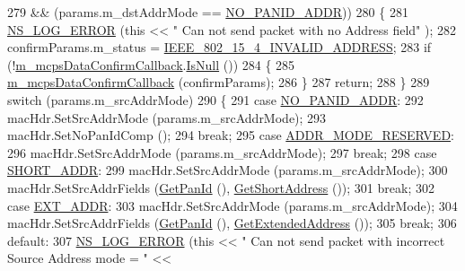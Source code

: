 \begin{DoxyCode}
279       && (params.m\_dstAddrMode == \hyperlink{group__lr-wpan_gga9ea4702ab11d5329e1593afebce06bbba9a46b3a665d4f92822cfa6080de87ab4}{NO\_PANID\_ADDR}))
280     \{
281       \hyperlink{group__logging_ga0261a8db1d4ac5f79417d117634fd455}{NS\_LOG\_ERROR} (\textcolor{keyword}{this} << \textcolor{stringliteral}{" Can not send packet with no Address field"} );
282       confirmParams.m\_status = \hyperlink{group__lr-wpan_gga50d67c8816b2ca8da8df30d045b1b705a4a8505d97c4183f601f17d5362bada9d}{IEEE\_802\_15\_4\_INVALID\_ADDRESS};
283       \textcolor{keywordflow}{if} (!\hyperlink{classns3_1_1LrWpanMac_a05eba7a98d1cbbf86151290069e093e0}{m\_mcpsDataConfirmCallback}.\hyperlink{classns3_1_1Callback_aa8e27826badbf37f84763f36f70d9b54}{IsNull} ())
284         \{
285           \hyperlink{classns3_1_1LrWpanMac_a05eba7a98d1cbbf86151290069e093e0}{m\_mcpsDataConfirmCallback} (confirmParams);
286         \}
287       \textcolor{keywordflow}{return};
288     \}
289   \textcolor{keywordflow}{switch} (params.m\_srcAddrMode)
290     \{
291     \textcolor{keywordflow}{case} \hyperlink{group__lr-wpan_gga9ea4702ab11d5329e1593afebce06bbba9a46b3a665d4f92822cfa6080de87ab4}{NO\_PANID\_ADDR}:
292       macHdr.SetSrcAddrMode (params.m\_srcAddrMode);
293       macHdr.SetNoPanIdComp ();
294       \textcolor{keywordflow}{break};
295     \textcolor{keywordflow}{case} \hyperlink{group__lr-wpan_gga9ea4702ab11d5329e1593afebce06bbbab3b2cd8e42a0d53dc6ae8e16c131f03a}{ADDR\_MODE\_RESERVED}:
296       macHdr.SetSrcAddrMode (params.m\_srcAddrMode);
297       \textcolor{keywordflow}{break};
298     \textcolor{keywordflow}{case} \hyperlink{group__lr-wpan_gga9ea4702ab11d5329e1593afebce06bbba7bf58267dde39bdabfeeb5793450c5e3}{SHORT\_ADDR}:
299       macHdr.SetSrcAddrMode (params.m\_srcAddrMode);
300       macHdr.SetSrcAddrFields (\hyperlink{classns3_1_1LrWpanMac_a6a9b119e3bb6e77074c790a65fdf8a6c}{GetPanId} (), \hyperlink{classns3_1_1LrWpanMac_ad4aad83b81f2bea0ddb7e14e6280f946}{GetShortAddress} ());
301       \textcolor{keywordflow}{break};
302     \textcolor{keywordflow}{case} \hyperlink{group__lr-wpan_gga9ea4702ab11d5329e1593afebce06bbba9b5d65e7aa5fc57c353c7c84cfe5115c}{EXT\_ADDR}:
303       macHdr.SetSrcAddrMode (params.m\_srcAddrMode);
304       macHdr.SetSrcAddrFields (\hyperlink{classns3_1_1LrWpanMac_a6a9b119e3bb6e77074c790a65fdf8a6c}{GetPanId} (), \hyperlink{classns3_1_1LrWpanMac_a3602b57e8b460359c7f32854ca50e954}{GetExtendedAddress} ());
305       \textcolor{keywordflow}{break};
306     \textcolor{keywordflow}{default}:
307       \hyperlink{group__logging_ga0261a8db1d4ac5f79417d117634fd455}{NS\_LOG\_ERROR} (\textcolor{keyword}{this} << \textcolor{stringliteral}{" Can not send packet with incorrect Source Address mode = "} << 

\end{DoxyCode}
